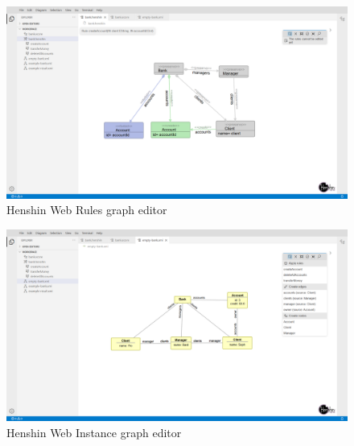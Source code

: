\documentclass[conference,onecolumn]{IEEEtran}
\begin{document}
  \begin{figure}[H]
    \centering
    \includegraphics[width=1\textwidth]{rule-ui}
    \caption{Henshin Web Rules graph editor}
    \label{fig:rule-ui}
  \end{figure}

  \begin{figure}[H]
    \centering
    \includegraphics[width=1\textwidth]{xmi-ui}
    \caption{Henshin Web Instance graph editor}
    \label{fig:xmi-ui}
  \end{figure}

  \printbibliography
\end{document}
